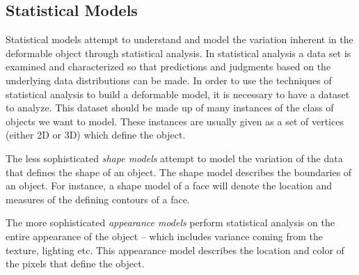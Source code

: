 \documentclass[11pt,a4paper,twoside]{report}
\begin{document}
\subsection{Statistical Models}
Statistical models attempt to understand and model the variation inherent in the
deformable object through statistical analysis. In statistical analysis a data set
is examined and characterized so that predictions and judgments based on the
underlying data distributions can be made. In order to use the techniques of statistical
analysis to build a deformable model, it is necessary to have a dataset to analyze. This
dataset should be made up of many instances of the class of objects we want to
model. These instances are usually given as a set of vertices (either 2D or 3D)
which define the object. 

The less sophisticated \textit{shape models} attempt to model the variation of the data that defines the shape of an
object. The shape model describes the boundaries of an object. For instance, a
shape model of a face will denote the location and measures of the defining
contours of a face.

The more sophisticated \textit{appearance models} perform statistical analysis on the entire
appearance of the object -- which includes variance coming from the texture, lighting etc. 
This appearance model describes the location and color of the pixels
that define the object.
\end{document}
